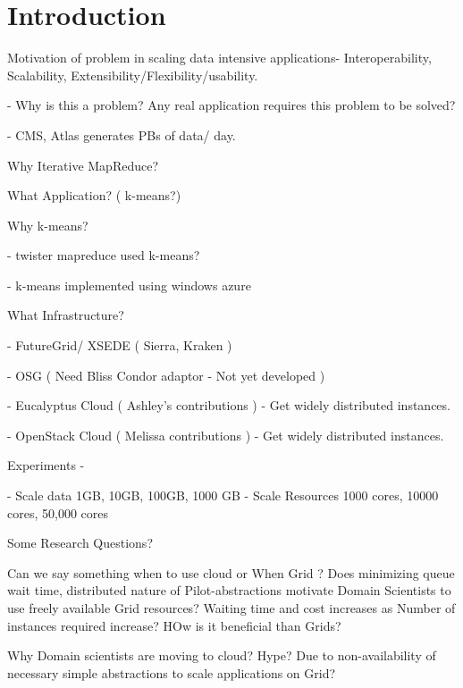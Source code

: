 \documentclass[times]{cpeauth}
\begin{document}

\vspace{-6pt}

\section{Introduction}
\vspace{-2pt}
Motivation of problem in scaling data intensive applications- 
Interoperability, Scalability, Extensibility/Flexibility/usability.

   - Why is this a problem? Any real application requires this problem to be solved?

   - CMS, Atlas generates PBs of data/ day.

Why Iterative MapReduce?

What Application?  ( k-means?)

Why k-means?

  - twister mapreduce used k-means?

  - k-means implemented using windows azure

What Infrastructure?

  - FutureGrid/ XSEDE ( Sierra, Kraken )

  - OSG ( Need Bliss Condor adaptor - Not yet developed )

  - Eucalyptus Cloud ( Ashley's contributions )
    - Get widely distributed instances. 

  - OpenStack Cloud ( Melissa contributions )
    - Get widely distributed instances. 

Experiments -

  - Scale data 1GB, 10GB, 100GB, 1000 GB
  - Scale Resources 1000 cores, 10000 cores, 50,000 cores


Some Research Questions?
 
Can we say something when to use cloud or When Grid ? 
Does minimizing queue wait time, distributed nature of Pilot-abstractions motivate Domain Scientists to use freely available Grid resources? 
Waiting time and cost increases as Number of instances required increase? 
HOw is it beneficial than Grids? 

Why Domain scientists are moving to cloud? Hype? Due to non-availability of necessary simple abstractions to scale applications on Grid?
\end{document}
